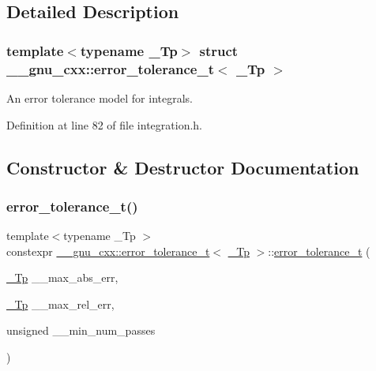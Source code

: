 \subsection{Detailed Description}
\subsubsection*{template$<$typename \+\_\+\+Tp$>$\newline
struct \+\_\+\+\_\+gnu\+\_\+cxx\+::error\+\_\+tolerance\+\_\+t$<$ \+\_\+\+Tp $>$}

An error tolerance model for integrals. 

Definition at line 82 of file integration.\+h.



\subsection{Constructor \& Destructor Documentation}
\mbox{\label{struct____gnu__cxx_1_1error__tolerance__t_a4d33e75bacc130e0d0b3edbfdeaea975}} 
\subsubsection{\texorpdfstring{error\+\_\+tolerance\+\_\+t()}{error\_tolerance\_t()}}
{\footnotesize\ttfamily template$<$typename \+\_\+\+Tp $>$ \\
constexpr \hyperlink{struct____gnu__cxx_1_1error__tolerance__t}{\+\_\+\+\_\+gnu\+\_\+cxx\+::error\+\_\+tolerance\+\_\+t}$<$ \hyperlink{namespace____gnu__cxx_a3b19a9c800ca194374ef9172290f7d79}{\+\_\+\+Tp} $>$\+::\hyperlink{struct____gnu__cxx_1_1error__tolerance__t}{error\+\_\+tolerance\+\_\+t} (\begin{DoxyParamCaption}\item[{\hyperlink{namespace____gnu__cxx_a3b19a9c800ca194374ef9172290f7d79}{\+\_\+\+Tp}}]{\+\_\+\+\_\+max\+\_\+abs\+\_\+err,  }\item[{\hyperlink{namespace____gnu__cxx_a3b19a9c800ca194374ef9172290f7d79}{\+\_\+\+Tp}}]{\+\_\+\+\_\+max\+\_\+rel\+\_\+err,  }\item[{unsigned}]{\+\_\+\+\_\+min\+\_\+num\+\_\+passes }\end{DoxyParamCaption})}



